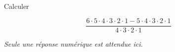 Calculer

$$\frac{6\cdot 5 \cdot 4\cdot 3\cdot 2\cdot 1 - 5 \cdot 4\cdot 3\cdot 2\cdot 1}{4\cdot 3\cdot 2\cdot 1}$$

\emph{Seule une réponse numérique est attendue ici.}